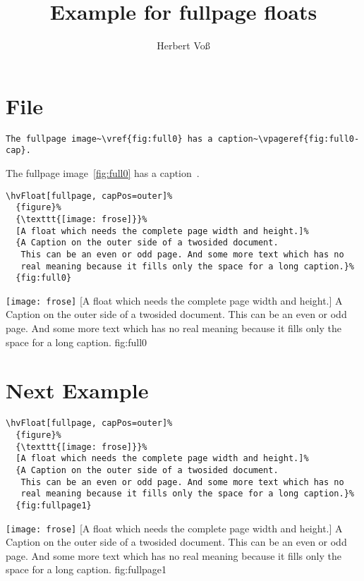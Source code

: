 \documentclass[twoside,twocolumn]{scrartcl}
\begin{document}
\title{Example for fullpage floats}
\author{Herbert Voß}
\maketitle

\tableofcontents

\blinddocument

\section{File \texttt{\jobname}}

\begin{lstlisting}
The fullpage image~\vref{fig:full0} has a caption~\vpageref{fig:full0-cap}.
\end{lstlisting}

The fullpage image~\vref{fig:full0} has a caption~.

\begin{lstlisting}
\hvFloat[fullpage, capPos=outer]%
  {figure}%
  {\texttt{[image: frose]}}%
  [A float which needs the complete page width and height.]%
  {A Caption on the outer side of a twosided document. 
   This can be an even or odd page. And some more text which has no
   real meaning because it fills only the space for a long caption.}%
  {fig:full0}
\end{lstlisting}

\Float[capPos=outer]
%
  {\texttt{[image: frose]}}%
  [A float which needs the complete page width and height.]%
  {A Caption on the outer side of a twosided document. 
   This can be an even or odd page. And some more text which has no
   real meaning because it fills only the space for a long caption.}%
  {fig:full0}

\blinddocument

\section{Next Example}

\begin{lstlisting}
\hvFloat[fullpage, capPos=outer]%
  {figure}%
  {\texttt{[image: frose]}}%
  [A float which needs the complete page width and height.]%
  {A Caption on the outer side of a twosided document. 
   This can be an even or odd page. And some more text which has no
   real meaning because it fills only the space for a long caption.}%
  {fig:fullpage1}
\end{lstlisting}


\Float[capPos=outer]
%
  {\texttt{[image: frose]}}%
  [A float which needs the complete page width and height.]%
  {A Caption on the outer side of a twosided document. 
   This can be an even or odd page. And some more text which has no
   real meaning because it fills only the space for a long caption.}%
  {fig:fullpage1}

\blinddocument


\Blindtext
\end{document}
